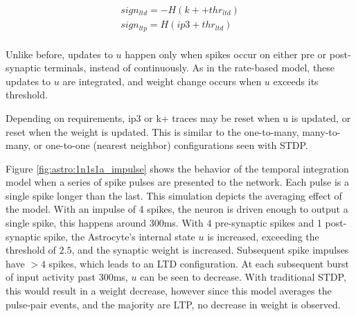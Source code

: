     \begin{align}
      sign_{ltd} = -H(k+ + thr_{ltd}) \\
      sign_{ltp} = H(ip3 + thr_{ltd}) \\
    \end{align}

    Unlike before, updates to $u$ happen only when spikes occur on either pre or
    post-synaptic terminals, instead of continuously. As in the rate-based
    model, these updates to $u$ are integrated, and weight change occurs when
    $u$ exceeds its threshold.

    Depending on requirements, ip3 or k+ traces may be reset when u is updated,
    or reset when the weight is updated. This is similar to the one-to-many,
    many-to-many, or one-to-one (nearest neighbor) configurations seen with
    STDP.

    Figure \ref{fig:astro:1n1s1a_impulse} shows the behavior of the temporal
    integration model when a series of spike pulses are presented to the
    network. Each pulse is a single spike longer than the last. This simulation
    depicts the averaging effect of the model. With an impulse of 4 spikes, the
    neuron is driven enough to output a single spike, this happens around
    300ms. With 4 pre-synaptic spikes and 1 post-synaptic spike, the Astrocyte's
    internal state $u$ is increased, exceeding the threshold of $2.5$, and the
    synaptic weight is increased. Subsequent spike impulses have $>4$ spikes,
    which leads to an LTD configuration. At each subsequent burst of input
    activity past 300ms, $u$ can be seen to decrease. With traditional STDP,
    this would result in a weight decrease, however since this model averages
    the pulse-pair events, and the majority are LTP, no decrease in weight is
    observed.

    


    
